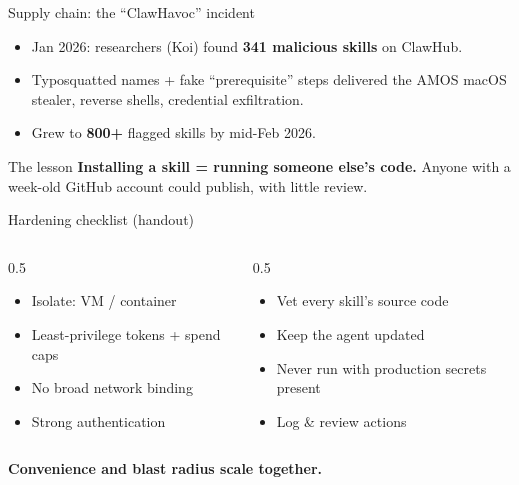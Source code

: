 \documentclass[aspectratio=169,11pt]{beamer}
\begin{document}
\begin{frame}{Supply chain: the ``ClawHavoc'' incident}
  \begin{itemize}
    \item Jan 2026: researchers (Koi) found \textbf{341 malicious skills} on ClawHub.
    \item Typosquatted names + fake ``prerequisite'' steps delivered the AMOS macOS stealer, reverse shells, credential exfiltration.
    \item Grew to \textbf{800+} flagged skills by mid-Feb 2026.
  \end{itemize}
  \vspace{1em}
  \begin{block}{The lesson}
    \textbf{Installing a skill = running someone else's code.} Anyone with a
    week-old GitHub account could publish, with little review.
  \end{block}
\end{frame}

\begin{frame}{Hardening checklist (handout)}
  \begin{columns}[T]
    \begin{column}{0.5\textwidth}
      \begin{itemize}
        \item Isolate: VM / container
        \item Least-privilege tokens + spend caps
        \item No broad network binding
        \item Strong authentication
      \end{itemize}
    \end{column}
    \begin{column}{0.5\textwidth}
      \begin{itemize}
        \item Vet every skill's source code
        \item Keep the agent updated
        \item Never run with production secrets present
        \item Log \& review actions
      \end{itemize}
    \end{column}
  \end{columns}
  \vspace{1em}
  \begin{center}
    \textcolor{clawOrange}{\textbf{Convenience and blast radius scale together.}}
  \end{center}
\end{frame}
\end{document}
